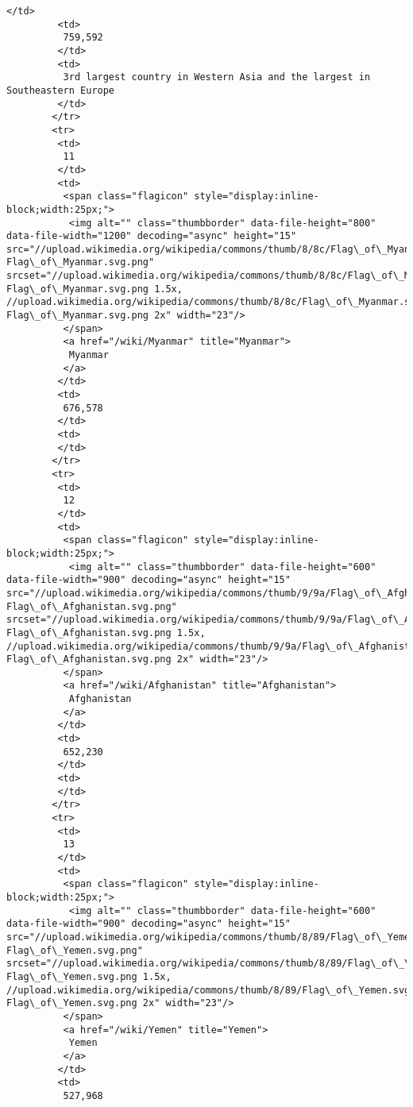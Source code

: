 \documentclass[11pt]{article}
\begin{document}
\begin{Verbatim}[commandchars=\\\{\}]
         </td>
         <td>
          759,592
         </td>
         <td>
          3rd largest country in Western Asia and the largest in Southeastern Europe
         </td>
        </tr>
        <tr>
         <td>
          11
         </td>
         <td>
          <span class="flagicon" style="display:inline-block;width:25px;">
           <img alt="" class="thumbborder" data-file-height="800" data-file-width="1200" decoding="async" height="15" src="//upload.wikimedia.org/wikipedia/commons/thumb/8/8c/Flag\_of\_Myanmar.svg/23px-Flag\_of\_Myanmar.svg.png" srcset="//upload.wikimedia.org/wikipedia/commons/thumb/8/8c/Flag\_of\_Myanmar.svg/35px-Flag\_of\_Myanmar.svg.png 1.5x, //upload.wikimedia.org/wikipedia/commons/thumb/8/8c/Flag\_of\_Myanmar.svg/45px-Flag\_of\_Myanmar.svg.png 2x" width="23"/>
          </span>
          <a href="/wiki/Myanmar" title="Myanmar">
           Myanmar
          </a>
         </td>
         <td>
          676,578
         </td>
         <td>
         </td>
        </tr>
        <tr>
         <td>
          12
         </td>
         <td>
          <span class="flagicon" style="display:inline-block;width:25px;">
           <img alt="" class="thumbborder" data-file-height="600" data-file-width="900" decoding="async" height="15" src="//upload.wikimedia.org/wikipedia/commons/thumb/9/9a/Flag\_of\_Afghanistan.svg/23px-Flag\_of\_Afghanistan.svg.png" srcset="//upload.wikimedia.org/wikipedia/commons/thumb/9/9a/Flag\_of\_Afghanistan.svg/35px-Flag\_of\_Afghanistan.svg.png 1.5x, //upload.wikimedia.org/wikipedia/commons/thumb/9/9a/Flag\_of\_Afghanistan.svg/45px-Flag\_of\_Afghanistan.svg.png 2x" width="23"/>
          </span>
          <a href="/wiki/Afghanistan" title="Afghanistan">
           Afghanistan
          </a>
         </td>
         <td>
          652,230
         </td>
         <td>
         </td>
        </tr>
        <tr>
         <td>
          13
         </td>
         <td>
          <span class="flagicon" style="display:inline-block;width:25px;">
           <img alt="" class="thumbborder" data-file-height="600" data-file-width="900" decoding="async" height="15" src="//upload.wikimedia.org/wikipedia/commons/thumb/8/89/Flag\_of\_Yemen.svg/23px-Flag\_of\_Yemen.svg.png" srcset="//upload.wikimedia.org/wikipedia/commons/thumb/8/89/Flag\_of\_Yemen.svg/35px-Flag\_of\_Yemen.svg.png 1.5x, //upload.wikimedia.org/wikipedia/commons/thumb/8/89/Flag\_of\_Yemen.svg/45px-Flag\_of\_Yemen.svg.png 2x" width="23"/>
          </span>
          <a href="/wiki/Yemen" title="Yemen">
           Yemen
          </a>
         </td>
         <td>
          527,968

\end{Verbatim}
\end{document}
